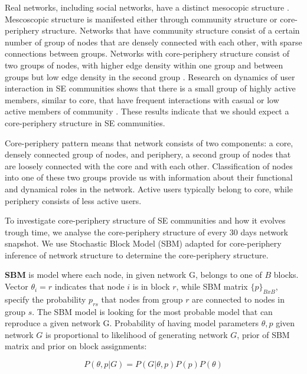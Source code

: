 Real networks, including social networks, have a distinct mesocopic structure \cite{fortunato2010community, gallagher2020clarified}. Mescoscopic structure is manifested either through community structure or core-periphery structure. Networks that have community structure consist of a certain number of group of nodes that are densely connected with each other, with sparse connections between groups. Networks with core-periphery structure consist of two groups of nodes, with higher edge density within one group and between groups but low edge density in the second group \cite{gallagher2020clarified}. Research on dynamics of user interaction in SE communities shows that there is a small group of highly active members, similar to core,  that have frequent interactions with casual or low active members of community \cite{santos2019activity, santos2019self}. These results indicate that we should expect a core-periphery structure in SE communities. 

Core-periphery pattern means that network consists of two components: a core, densely connected group of nodes, and periphery, a second group of nodes that are loosely connected with the core and with each other. Classification of nodes into one of these two groups provide us with information about their functional and dynamical roles in the network. Active users typically belong to core, while periphery consists of less active users.

To investigate core-periphery structure of SE communities and how it evolves trough time, we analyse the core-periphery structure of every 30 days network snapshot. We use Stochastic Block Model (SBM) adapted for core-periphery inference of network structure \cite{gallagher2020clarified} to determine the core-periphery structure.  

\textbf{SBM} is model where each node, in given network G,  belongs to one of $B$ blocks. Vector $\theta_i = r$ indicates that node $i$ is in block $r$, while SBM matrix $\{p\}_{BxB}$, specify the probability $p_{rs}$ that nodes from group $r$ are connected to nodes in group $s$. The SBM model is looking for the most probable model that can reproduce a given network G. Probability of having model parameters $\theta, p$ given network $G$ is proportional to likelihood of generating network $G$, prior of SBM matrix and prior on block assignments:

\begin{equation}
P(\theta, p| G) = P(G | \theta , p) P(p) P(\theta) 
\end{equation}

